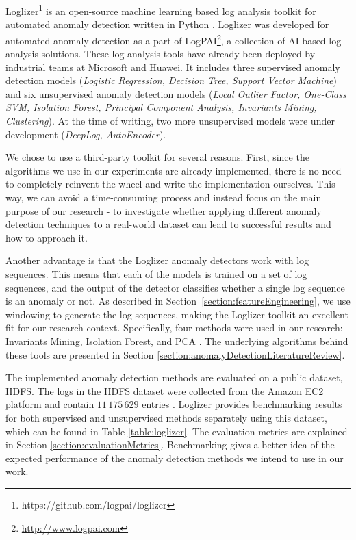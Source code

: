 Loglizer\footnote{https://github.com/logpai/loglizer} is an open-source machine learning based log analysis toolkit for automated anomaly detection written in Python \cite{he2016}. Loglizer was developed for automated anomaly detection as a part of LogPAI\footnote{\url{http://www.logpai.com}}, a collection of AI-based log analysis solutions. These log analysis tools have already been deployed by industrial teams at Microsoft and Huawei. It includes three supervised anomaly detection models (\textit{Logistic Regression, Decision Tree, Support Vector Machine}) and six unsupervised anomaly detection models (\textit{Local Outlier Factor, One-Class SVM, Isolation Forest, Principal Component Analysis, Invariants Mining, Clustering}). At the time of writing, two more unsupervised models were under development (\textit{DeepLog, AutoEncoder}). 

We chose to use a third-party toolkit for several reasons. First, since the algorithms we use in our experiments are already implemented, there is no need to completely reinvent the wheel and write the implementation ourselves. This way, we can avoid a time-consuming process and instead focus on the main purpose of our research - to investigate whether applying different anomaly detection techniques to a real-world dataset can lead to successful results and how to approach it.

Another advantage is that the Loglizer anomaly detectors work with log sequences. This means that each of the models is trained on a set of log sequences, and the output of the detector classifies whether a single log sequence is an anomaly or not. As described in Section~\ref{section:featureEngineering}, we use windowing to generate the log sequences, making the Loglizer toolkit an excellent fit for our research context. Specifically, four methods were used in our research: Invariants Mining, Isolation Forest, and PCA . The underlying algorithms behind these tools are presented in Section \ref{section:anomalyDetectionLiteratureReview}.

The implemented anomaly detection methods are evaluated on a public dataset, HDFS. The logs in the HDFS dataset were collected from the Amazon EC2 platform and contain $11\,175\,629$ entries \cite{xu2009}. Loglizer provides benchmarking results for both supervised and unsupervised methods separately using this dataset, which can be found in Table \ref{table:loglizer}. The evaluation metrics are explained in Section \ref{section:evaluationMetrics}. Benchmarking gives a better idea of the expected performance of the anomaly detection methods we intend to use in our work.  

